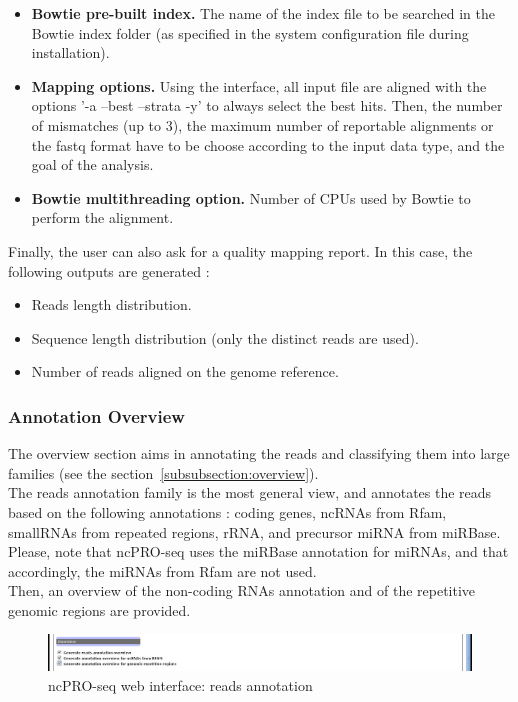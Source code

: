 \documentclass[12pt]{article}
\def \ncpip{ncPRO-seq}
\begin{document}
\begin{itemize}
\item \textbf{Bowtie pre-built index.} The name of the index file to be searched in the Bowtie index folder (as specified in the system configuration file during installation). 
\item \textbf{Mapping options.} Using the interface, all input file are aligned with the options '-a --best --strata -y' to always select the best hits. Then, the number of mismatches (up to 3), the maximum number of reportable alignments or the fastq format have to be choose according to the input data type, and the goal of the analysis. 
\item \textbf{Bowtie multithreading option.} Number of CPUs used by Bowtie to perform the alignment.
\end{itemize}
Finally, the user can also ask for a quality mapping report. In this case, the following outputs are generated :
\begin{itemize}
\item Reads length distribution.
\item Sequence length distribution (only the distinct reads are used).
\item Number of reads aligned on the genome reference.
\end{itemize}

\subsubsection{Annotation Overview}
The overview section aims in annotating the reads and classifying them into large families (see the section~\ref{subsubsection:overview}).\\
The reads annotation family is the most general view, and annotates the reads based on the following annotations : coding genes, ncRNAs from Rfam, smallRNAs from repeated regions, rRNA, and precursor miRNA from miRBase. Please, note that \ncpip{} uses the miRBase annotation for miRNAs, and that accordingly, the miRNAs from Rfam are not used.\\
Then, an overview of the non-coding RNAs annotation and of the repetitive genomic regions are provided.
\begin{figure}[!h]
\includegraphics[width=\textwidth]{web_3.png}
\caption{\ncpip{} web interface: reads annotation}
\label{fig:web3}
\end{figure} 
\end{document}
